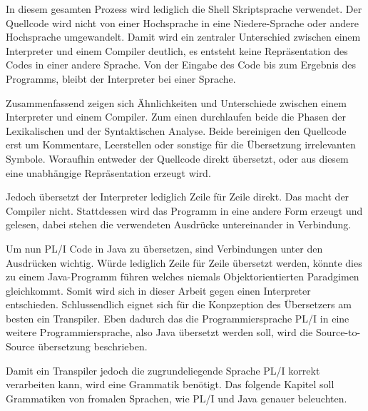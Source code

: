 In diesem gesamten Prozess wird lediglich die Shell Skriptsprache verwendet. Der Quellcode wird nicht von einer Hochsprache in eine Niedere-Sprache oder andere Hochsprache umgewandelt. Damit wird ein zentraler Unterschied zwischen einem Interpreter und einem Compiler deutlich, es entsteht keine Repräsentation des Codes in einer andere Sprache. Von der Eingabe des Code bis zum Ergebnis des Programms, bleibt der Interpreter bei einer Sprache.


Zusammenfassend zeigen sich Ähnlichkeiten und Unterschiede zwischen einem Interpreter und einem Compiler. Zum einen durchlaufen beide die Phasen der Lexikalischen und der Syntaktischen Analyse. 
Beide bereinigen den Quellcode erst um Kommentare, Leerstellen oder sonstige für die Übersetzung irrelevanten Symbole. Woraufhin entweder der Quellcode direkt übersetzt, oder aus diesem eine unabhängige Repräsentation erzeugt wird. 

Jedoch übersetzt der Interpreter lediglich Zeile für Zeile direkt. Das macht der Compiler nicht. Stattdessen wird das Programm in eine andere Form erzeugt und gelesen, dabei stehen die verwendeten Ausdrücke untereinander in Verbindung.

Um nun PL/I Code in Java zu übersetzen, sind Verbindungen unter den Ausdrücken wichtig. Würde lediglich Zeile für Zeile übersetzt werden, könnte dies zu einem Java-Programm führen welches niemals Objektorientierten Paradgimen gleichkommt. Somit wird sich in dieser Arbeit gegen einen Interpreter entschieden.
Schlussendlich eignet sich für die Konpzeption des Übersetzers am besten ein Transpiler. Eben dadurch das die Programmiersprache PL/I in eine weitere Programmiersprache, also Java übersetzt werden soll, wird die Source-to-Source übersetzung beschrieben. 

Damit ein Transpiler jedoch die zugrundeliegende Sprache PL/I korrekt verarbeiten kann, wird eine Grammatik benötigt. Das folgende Kapitel soll Grammatiken von fromalen Sprachen, wie PL/I und Java genauer beleuchten.


\pagebreak
   
